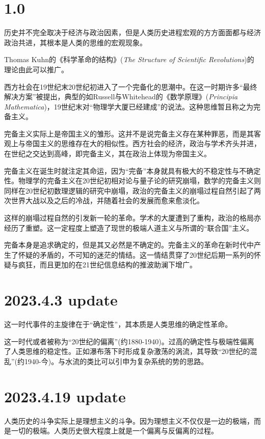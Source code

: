 \documentclass{ctexart}
\begin{document}
\section{1.0}

历史并不完全取决于经济与政治因素，但是人类历史进程宏观的方方面面都与经济政治共进，其根本是人类的思维的宏观现象。

Thomas Kuhn的《科学革命的结构》(\textit{The Structure of Scientific Revolutions})的理论由此可以推广。

西方社会在19世纪末20世纪初进入了一个完备化的思潮中。在这一时期许多“最终解决方案”被提出，典型的如Russell与Whitehead的《数学原理》(\textit{Principia Mathematica})，19世纪末对“物理学大厦已经建成”的说法。这种思维暂且称之为完备主义。

完备主义实际上是帝国主义的雏形。这并不是说完备主义存在某种罪恶，而是其客观上与帝国主义的思维存在大的相似性。西方社会的经济，政治与学术齐头并进，在世纪之交达到高峰，即完备主义，其在政治上体现为帝国主义。

完备主义在诞生时就注定其命运，因为“完备”本身就具有极大的不稳定性与不确定性。物理学的完备主义在20世纪初相对论与量子论的研究崩塌，数学的完备主义则同样在20世纪初数理逻辑的研究中崩塌，政治的完备主义的崩塌过程自然引起了两次世界大战以及之后的冷战，并随着社会的发展而愈来愈淡化。

这样的崩塌过程自然的引发新一轮的革命。学术的大厦遭到了重构，政治的格局亦经历了重塑。这一定程度上塑造了现世的极端人道主义与所谓的“联合国”主义。

完备本身是追求确定的，但是其又必然是不确定的。完备主义的革命在新时代中产生了怀疑的矛盾的，不可知的迷茫的情结。这一情结贯穿了20世纪后期一系列的怀疑与疯狂，而且更加的在21世纪信息结构的推波助澜下增广。

\section{2023.4.3 update}

这一时代事件的主旋律在于“确定性”，其本质是人类思维的确定性革命。

这一时代或者被称为“20世纪的偏离”(约1880-1940)。过高的确定性与极端性偏离了人类思维的稳定性。正如瀑布落下时形成复杂激荡的涡流，其导致“20世纪的混乱”(约1940-今)。与水流的类比可以引申为复杂系统的势的思路。

\section{2023.4.19 update}

人类历史的斗争实际上是理想主义的斗争。因为理想主义不仅仅是一边的极端，而是一切的极端。人类历史很大程度上就是一个偏离与反偏离的过程。
\end{document}
